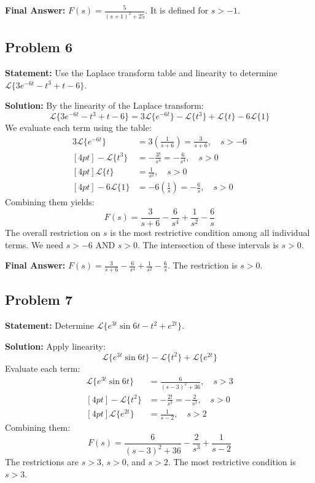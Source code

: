 \documentclass[11pt, a4paper]{article}
\theoremstyle{definition}
\theoremstyle{remark}
\begin{document}
\textbf{Final Answer:} $F(s) = \frac{5}{(s+1)^2 + 25}$. It is defined for $s > -1$.

\vspace{1em}
\subsection{Problem 6}
\textbf{Statement:} Use the Laplace transform table and linearity to determine $\mathscr{L}\{3e^{-6t} - t^3 + t - 6\}$.

\textbf{Solution:}
By the linearity of the Laplace transform:
\[
\mathscr{L}\{3e^{-6t} - t^3 + t - 6\} = 3\mathscr{L}\{e^{-6t}\} - \mathscr{L}\{t^3\} + \mathscr{L}\{t\} - 6\mathscr{L}\{1\}
\]
We evaluate each term using the table:
\begin{align*}
    3\mathscr{L}\{e^{-6t}\} &= 3 \left( \frac{1}{s + 6} \right) = \frac{3}{s + 6}, \quad s > -6 \\ [4pt]
    -\mathscr{L}\{t^3\} &= -\frac{3!}{s^4} = -\frac{6}{s^4}, \quad s > 0 \\ [4pt]
    \mathscr{L}\{t\} &= \frac{1}{s^2}, \quad s > 0 \\ [4pt]
    -6\mathscr{L}\{1\} &= -6 \left( \frac{1}{s} \right) = -\frac{6}{s}, \quad s > 0
\end{align*}
Combining them yields:
\[
F(s) = \frac{3}{s + 6} - \frac{6}{s^4} + \frac{1}{s^2} - \frac{6}{s}
\]
The overall restriction on $s$ is the most restrictive condition among all individual terms. We need $s > -6$ AND $s > 0$. The intersection of these intervals is $s > 0$.

\textbf{Final Answer:} $F(s) = \frac{3}{s + 6} - \frac{6}{s^4} + \frac{1}{s^2} - \frac{6}{s}$. The restriction is $s > 0$.

\vspace{1em}
\subsection{Problem 7}
\textbf{Statement:} Determine $\mathscr{L}\{e^{3t} \sin 6t - t^2 + e^{2t}\}$.

\textbf{Solution:}
Apply linearity:
\[
\mathscr{L}\{e^{3t} \sin 6t\} - \mathscr{L}\{t^2\} + \mathscr{L}\{e^{2t}\}
\]
Evaluate each term:
\begin{align*}
    \mathscr{L}\{e^{3t} \sin 6t\} &= \frac{6}{(s - 3)^2 + 36}, \quad s > 3 \\ [4pt]
    -\mathscr{L}\{t^2\} &= -\frac{2!}{s^3} = -\frac{2}{s^3}, \quad s > 0 \\ [4pt]
    \mathscr{L}\{e^{2t}\} &= \frac{1}{s - 2}, \quad s > 2
\end{align*}
Combining them:
\[
F(s) = \frac{6}{(s - 3)^2 + 36} - \frac{2}{s^3} + \frac{1}{s - 2}
\]
The restrictions are $s > 3$, $s > 0$, and $s > 2$. The most restrictive condition is $s > 3$.
\end{document}

